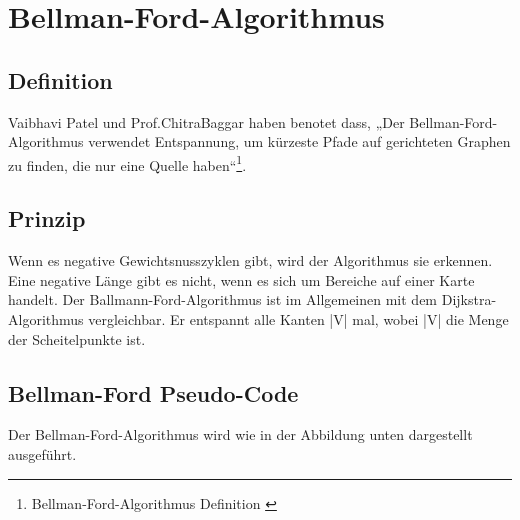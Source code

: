 \section{Bellman-Ford-Algorithmus}
\label{Bellman-Ford-Algorithmus}
\subsection{Definition}

Vaibhavi Patel und Prof.ChitraBaggar haben benotet dass, „Der Bellman-Ford-Algorithmus verwendet Entspannung, um kürzeste Pfade auf gerichteten Graphen zu finden, die nur eine Quelle haben“\footnote{Bellman-Ford-Algorithmus Definition \cite{Vaibhavi2014}}.
\subsection{Prinzip}
Wenn es negative Gewichtsnusszyklen gibt, wird der Algorithmus sie erkennen. Eine negative Länge gibt es nicht, wenn es sich um Bereiche auf einer Karte handelt. Der Ballmann-Ford-Algorithmus ist im Allgemeinen mit dem Dijkstra-Algorithmus vergleichbar. Er entspannt alle Kanten |V| mal, wobei |V| die Menge der Scheitelpunkte ist\cite{Vaibhavi2014}.

\subsection{Bellman-Ford Pseudo-Code}
Der Bellman-Ford-Algorithmus wird wie in der Abbildung unten dargestellt ausgeführt.


